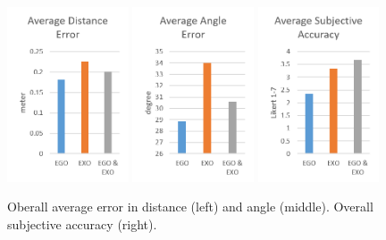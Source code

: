 \begin{figure}[htb]
	\centering
	\includegraphics[width=0.32\textwidth]{figures/averageDistanceError.png}
	\includegraphics[width=0.32\textwidth]{figures/averageAngleError.png}
	\includegraphics[width=0.32\textwidth]{figures/averageSubjectiveAccuracy.png}
	\caption[Overall accuracy]{Oberall average error in distance (left) and angle (middle). Overall subjective accuracy (right).}
	\label{fig:cumulatedError}
\end{figure}



